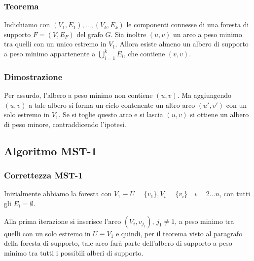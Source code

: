 \documentclass[../template]{subfiles}
\begin{document}
\subsubsection{Teorema}
Indichiamo con $(V_1, E_1),\ldots ,(V_k, E_k)$ le componenti connesse di una foresta di supporto
$F = (V, E_F)$ del grafo $G$. Sia inoltre $(u, v)$ un arco a peso minimo tra quelli con un unico estremo
in $V_1$. Allora esiste almeno un albero di supporto a peso minimo appartenente a $\bigcup^k_{i=1} E_i$,
che contiene $(v, v)$.

\subsubsection{Dimostrazione}
Per assurdo, l'albero a peso minimo non contiene $(u, v)$. Ma aggiungendo $(u, v)$ a tale albero si forma un
ciclo contenente un altro arco $(u', v')$  con un solo estremo in $V_1$.
Se si toglie questo arco e si lascia $(u, v)$ si ottiene un albero di peso minore,
contraddicendo l'ipotesi.

\newpage
\subsection{Algoritmo MST-1}
\begin{center}
\end{center}

\subsubsection{Correttezza MST-1}
Inizialmente abbiamo la foresta con $V_1 \equiv U = \{v_1\}, V_i = \{v_i\} \quad i=2\ldots n$, con tutti gli $E_i = \emptyset$.

Alla prima iterazione si inserisce l'arco $(V_i, v_{j_1})$, $j_1 \neq 1$, a peso minimo tra quelli con un solo estremo in $U \equiv V_1$
e quindi, per il teorema visto al paragrafo della foresta di supporto, tale arco farà parte dell'albero di supporto a peso minimo
tra tutti i possibili alberi di supporto.
\end{document}

